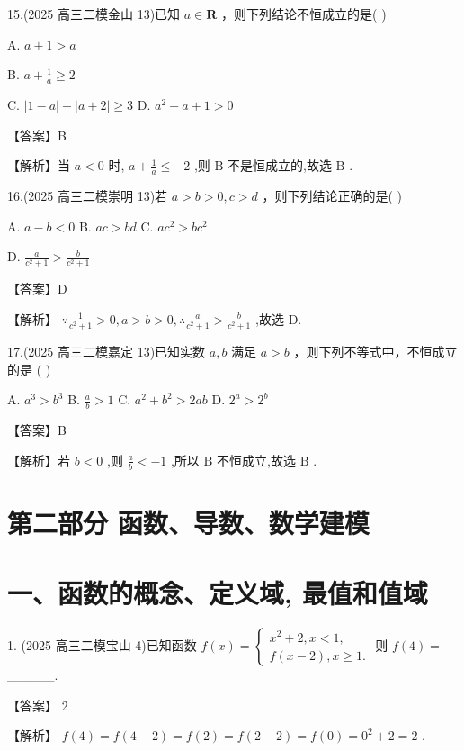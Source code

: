 \documentclass[10pt]{article}
\begin{document}
15.(2025 高三二模金山 13)已知 \(a \in  \mathbf{R}\) ，则下列结论不恒成立的是( )

A. \(a + 1 > a\)

B. \(a + \frac{1}{a} \geq  2\)

C. \(\left| {1 - a}\right|  + \left| {a + 2}\right|  \geq  3\) D. \({a}^{2} + a + 1 > 0\)

【答案】B

【解析】当 \(a < 0\) 时, \(a + \frac{1}{a} \leq   - 2\) ,则 \(\mathrm{B}\) 不是恒成立的,故选 \(\mathrm{B}\) .

16.(2025 高三二模崇明 13)若 \(a > b > 0,c > d\) ，则下列结论正确的是( )

A. \(a - b < 0\) B. \({ac} > {bd}\) C. \(a{c}^{2} > b{c}^{2}\)

D. \(\frac{a}{{c}^{2} + 1} > \frac{b}{{c}^{2} + 1}\)

【答案】D

【解析】 \(\because \frac{1}{{c}^{2} + 1} > 0,a > b > 0,\therefore \frac{a}{{c}^{2} + 1} > \frac{b}{{c}^{2} + 1}\) ,故选 D.

17.(2025 高三二模嘉定 13)已知实数 \(a,b\) 满足 \(a > b\) ，则下列不等式中，不恒成立的是 ( )

A. \({a}^{3} > {b}^{3}\) B. \(\frac{a}{b} > 1\) C. \({a}^{2} + {b}^{2} > {2ab}\) D. \({2}^{a} > {2}^{b}\)

【答案】B

【解析】若 \(b < 0\) ,则 \(\frac{a}{b} <  - 1\) ,所以 \(\mathrm{B}\) 不恒成立,故选 \(\mathrm{B}\) .

\section*{第二部分 函数、导数、数学建模}

\section*{一、函数的概念、定义域, 最值和值域}

1. (2025 高三二模宝山 4)已知函数 \(f\left( x\right)  = \left\{  \begin{array}{l} {x}^{2} + 2,x < 1, \\  f\left( {x - 2}\right) ,x \geq  1. \end{array}\right.\) 则 \(f\left( 4\right)  =\) \_\_\_\_\_.

【答案】 2

【解析】 \(f\left( 4\right)  = f\left( {4 - 2}\right)  = f\left( 2\right)  = f\left( {2 - 2}\right)  = f\left( 0\right)  = {0}^{2} + 2 = 2\) .
\end{document}
